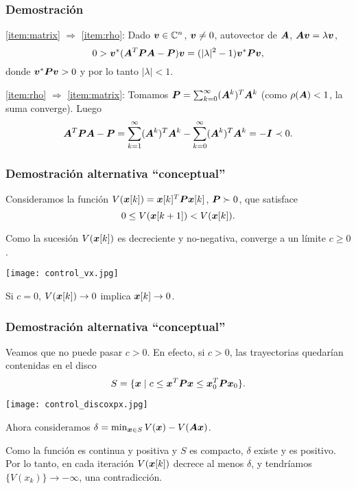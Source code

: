 \documentclass[aspectratio=169,12pt,spanish]{beamer}
\begin{document}

\begin{frame}
\frametitle{Demostración}

\ref{item:matrix} $\Rightarrow$ \ref{item:rho}: Dado $\bm{v} \in \mathbb{C}^n$, $\bm{v} \neq 0$, autovector de $\bm{A}$, $\bm{A}\bm{v} = \lambda \bm{v}$,
$$
0 > \bm{v}^* (\bm{A}^T \bm{P} \bm{A} - \bm{P})\bm{v} = (|\lambda|^2 - 1) \bm{v}^* \bm{P} \bm{v},
$$
donde $\bm{v}^* \bm{P} \bm{v} > 0$ y por lo tanto $|\lambda| < 1$.

\ref{item:rho} $\Rightarrow$ \ref{item:matrix}: Tomamos $\bm{P} = \sum_{k=0}^{\infty}(\bm{A}^k)^T \bm{A}^k$ (como $\rho(\bm{A}) < 1$, la suma converge). Luego
$$
\bm{A}^T \bm{P} \bm{A} - \bm{P} = \sum_{k=1}^{\infty} (\bm{A}^k)^T \bm{A}^k - \sum_{k=0}^{\infty} (\bm{A}^k)^T \bm{A}^k = - \bm{I} \prec 0.
$$

\end{frame}



\begin{frame}
\frametitle{Demostración alternativa ``conceptual''}

Consideramos la función $V(\bm{x}[k]) = \bm{x}[k]^T \bm{P} \bm{x}[k]$, $\bm{P} \succ 0$, que satisface
$$0 \le V(\bm{x}[k+1]) < V(\bm{x}[k]).$$

Como la sucesión $V(\bm{x}[k])$ es decreciente y no-negativa, converge a un límite $c \ge 0$.
\begin{center}
\texttt{[image: control\_vx.jpg]}
\end{center}

Si $c = 0$, $V(\bm{x}[k]) \rightarrow 0$ implica $\bm{x}[k] \rightarrow  0$.

\end{frame}



\begin{frame}
\frametitle{Demostración alternativa ``conceptual''}

Veamos que no puede pasar $c > 0$. En efecto, si $c > 0$, las trayectorias quedarían contenidas en el disco
$$
S = \{ \bm{x} \mid c \le \bm{x}^T \bm{P} \bm{x} \le \bm{x}_0^T \bm{P} \bm{x}_0\}.
$$
\begin{center}
\texttt{[image: control\_discoxpx.jpg]}
\end{center}

Ahora consideramos $\delta = \min_{\bm{x} \in S} V(\bm{x}) - V(\bm{A} \bm{x})$.

Como la función es continua y positiva y $S$ es compacto, $\delta$ existe y es positivo. Por lo tanto, en cada iteración $V(\bm{x}[k])$ decrece al menos $\delta$, y tendríamos $\{V(x_k)\} \rightarrow -\infty$, una contradicción.


\end{frame}
\end{document}
